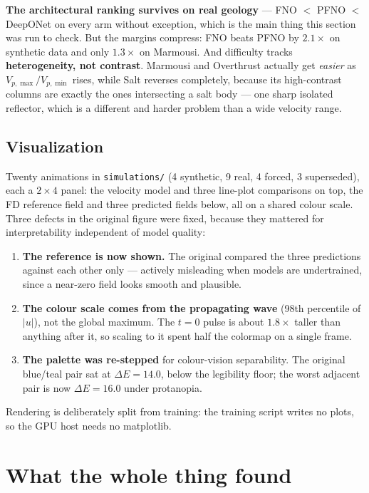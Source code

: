 \documentclass[11pt,a4paper]{article}
\begin{document}
\textbf{The architectural ranking survives on real geology} --- FNO $<$ PFNO $<$
DeepONet on every arm without exception, which is the main thing this section
was run to check. But the margins compress: FNO beats PFNO by $2.1\times$ on
synthetic data and only $1.3\times$ on Marmousi. And difficulty tracks
\textbf{heterogeneity, not contrast}. Marmousi and Overthrust actually get
\emph{easier} as $V_{p,\max}/V_{p,\min}$ rises, while Salt reverses completely,
because its high-contrast columns are exactly the ones intersecting a salt
body --- one sharp isolated reflector, which is a different and harder problem
than a wide velocity range.

\subsection{Visualization}

Twenty animations in \texttt{simulations/} (4 synthetic, 9 real, 4 forced, 3
superseded), each a $2\times4$ panel: the velocity model and three line-plot
comparisons on top, the FD reference field and three predicted fields below, all
on a shared colour scale. Three defects in the original figure were fixed,
because they mattered for interpretability independent of model quality:

\begin{enumerate}[leftmargin=*,itemsep=3pt]
\item \textbf{The reference is now shown.} The original compared the three
predictions against each other only --- actively misleading when models are
undertrained, since a near-zero field looks smooth and plausible.
\item \textbf{The colour scale comes from the propagating wave} (98th percentile
of $|u|$), not the global maximum. The $t=0$ pulse is about $1.8\times$ taller
than anything after it, so scaling to it spent half the colormap on a single
frame.
\item \textbf{The palette was re-stepped} for colour-vision separability. The
original blue/teal pair sat at $\Delta E=14.0$, below the legibility floor; the
worst adjacent pair is now $\Delta E=16.0$ under protanopia.
\end{enumerate}

Rendering is deliberately split from training: the training script writes no
plots, so the GPU host needs no matplotlib.

\section{What the whole thing found}
\end{document}
